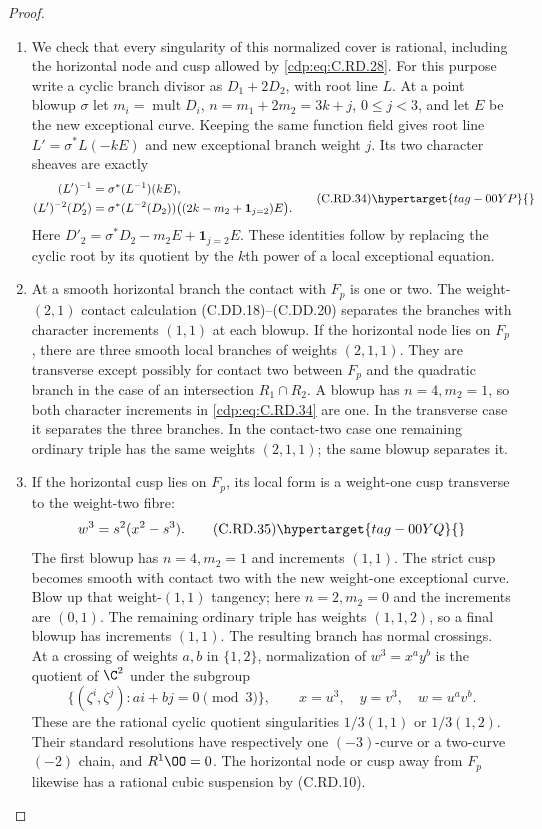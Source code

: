 \begin{proof}
\begin{enumerate}[label={$\langle1\rangle$\arabic*.},leftmargin=*]
\item We check that every singularity of this
normalized cover is rational, including the
horizontal node and cusp allowed by \eqref{cdp:eq:C.RD.28}.
For this purpose write a cyclic branch divisor
as $D_1+2D_2$, with root line $L$.
At a point blowup $\sigma$ let
$m_i=\operatorname{mult}D_i$,
$n=m_1+2m_2=3k+j$, $0\le j<3$, and let $E$
be the new exceptional curve. Keeping the
same function field gives root line
$L'=\sigma^*L(-kE)$ and new exceptional
branch weight $j$. Its two character sheaves
are exactly
\[
\begin{split}
 (L')^{-1}&=\sigma^*(L^{-1})(kE),\\
 (L')^{-2}(D'_2)
   &=\sigma^*(L^{-2}(D_2))
       \bigl((2k-m_2+\mathbf1_{j=2})E\bigr).
\end{split}
\tag{C.RD.34}\hypertarget{tag-00YP}{}\label{cdp:eq:C.RD.34}
\]
Here $D'_2=\sigma^*D_2-m_2E+\mathbf1_{j=2}E$.
These identities follow by replacing the
cyclic root by its quotient by the $k$th
power of a local exceptional equation.

\item At a smooth horizontal branch the contact
with $F_p$ is one or two. The weight-$(2,1)$
contact calculation (C.DD.18)--(C.DD.20)
separates the branches with character
increments $(1,1)$ at each blowup.
If the horizontal node lies on $F_p$, there
are three smooth local branches of weights
$(2,1,1)$. They are transverse except possibly
for contact two between $F_p$ and the
quadratic branch in the case of an intersection
$R_1\cap R_2$. A blowup has $n=4,m_2=1$,
so both character increments in \eqref{cdp:eq:C.RD.34}
are one. In the transverse case it separates
the three branches. In the contact-two case
one remaining ordinary triple has the same
weights $(2,1,1)$; the same blowup separates it.

\item If the horizontal cusp lies on $F_p$, its
local form is a weight-one cusp transverse
to the weight-two fibre:
\[
                        w^3=s^2(x^2-s^3).
\tag{C.RD.35}\hypertarget{tag-00YQ}{}\label{cdp:eq:C.RD.35}
\]
The first blowup has $n=4,m_2=1$ and
increments $(1,1)$. The strict cusp becomes
smooth with contact two with the new
weight-one exceptional curve. Blow up that
weight-$(1,1)$ tangency; here $n=2,m_2=0$
and the increments are $(0,1)$.
The remaining ordinary triple has weights
$(1,1,2)$, so a final blowup has increments
$(1,1)$. The resulting branch has normal
crossings. At a crossing of weights $a,b$
in $\{1,2\}$, normalization of
$w^3=x^a y^b$ is the quotient of $\C^2$
under the subgroup
\[
 \{(\zeta^i,\zeta^j):ai+bj=0\pmod3\},
 \qquad x=u^3,\quad y=v^3,\quad w=u^av^b.
\]
These are the rational cyclic quotient
singularities $1/3(1,1)$ or $1/3(1,2)$.
Their standard resolutions have respectively
one $(-3)$-curve or a two-curve $(-2)$ chain,
and $R^1\OO=0$. The horizontal node or cusp
away from $F_p$ likewise has a rational
cubic suspension by (C.RD.10).


\end{enumerate}
\end{proof}
